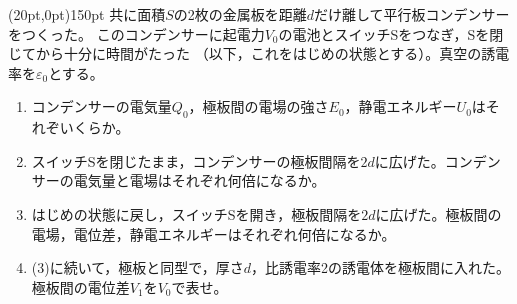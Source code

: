 \hakosyokika
\item
    \begin{mawarikomi}(20pt,0pt){150pt}{}
        共に面積$S$の2枚の金属板を距離$d$だけ離して平行板コンデンサーをつくった。
        このコンデンサーに起電力$V_0$の電池とスイッチSをつなぎ，Sを閉じてから十分に時間がたった
        （以下，これをはじめの状態とする）。真空の誘電率を$\varepsilon _0$とする。
        \begin{enumerate}
            \item コンデンサーの電気量$Q_0$，極板間の電場の強さ$E_0$，静電エネルギー$U_0$はそれぞいくらか。
            \item スイッチSを閉じたまま，コンデンサーの極板間隔を$2d$に広げた。コンデンサーの電気量と電場はそれぞれ何倍になるか。
            \item はじめの状態に戻し，スイッチSを開き，極板間隔を$2d$に広げた。極板間の電場，電位差，静電エネルギーはそれぞれ何倍になるか。
            \item (3)に続いて，極板と同型で，厚さ$d$，比誘電率2の誘電体を極板間に入れた。極板間の電位差$V_1$を$V_0$で表せ。
        \end{enumerate}
    \end{mawarikomi}
